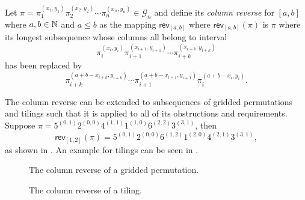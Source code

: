 \begin{definition}\label{def:rrgp}
Let $\pi=\pi_1^{(x_1,y_1)}\pi_2^{(x_2,y_2)}\dotsm\pi_n^{(x_n,y_n)} \in \mathcal{G}_n$ and define its \emph{column reverse} for $[a,b]$ where $a,b\in\mathbb{N}$ and $a\leq b$ as the mapping $\textsf{rev}_{[a,b]}$ where $\textsf{rev}_{[a,b]}(\pi)$ is $\pi$ where its longest subsequence whose columns all belong to interval
\[
\pi_{i}^{(x_i,y_i)}\pi_{i+1}^{(x_{i+1},y_{i+1})}\dotsm\pi_{i+k}^{(x_{i+k},y_{i+k})}
\]
has been replaced by 
\[
    \pi_{i+k}^{(a+b-x_{i+k},y_{i+k})}\dotsm\pi_{i+1}^{(a+b-x_{i+1},y_{i+1})}\pi_{i}^{(a+b-x_i,y_i)}.
\]
\end{definition}

The column reverse can be extended to subsequences of gridded permutations and tilings such that it is applied to all of its obstructions and requirements. Suppose $\pi = 5^{(0,1)}2^{(0,0)}4^{(1,1)}1^{(1,0)}6^{(2,2)}3^{(3,1)}$, then 
\[
\textsf{rev}_{[1,2]}(\pi) = 5^{(0,1)}2^{(0,0)}6^{(1,2)}1^{(2,0)}4^{(2,1)}3^{(3,1)},
\]
as shown in . An example for tilings can be seen in .

\begin{figure}[ht!]
    \centering
    
    \caption{The column reverse of a gridded permutation.}
    \label{fig:gp_col_rev}
\end{figure}

\begin{figure}[ht!]
    \centering
    
    \caption{The column reverse of a tiling.}
    \label{fig:t_col_rev}
\end{figure}

